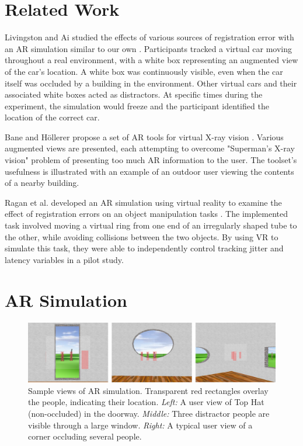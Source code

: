 \documentclass{acmsiggraph}                     %
\begin{document}
\section{Related Work}

Livingston and Ai studied the effects of various sources of registration error with an AR simulation similar to our own \cite{4637329}.  Participants tracked a virtual car moving throughout a real environment, with a white box representing an augmented view of the car's location.  A white box was continuously visible, even when the car itself was occluded by a building in the environment.  Other virtual cars and their associated white boxes acted as distractors.  At specific times during the experiment, the simulation would freeze and the participant identified the location of the correct car.

Bane and H\"{o}llerer propose a set of AR tools for virtual X-ray vision \cite{1383060}.  Various augmented views are presented, each attempting to overcome "Superman's X-ray vision" problem of presenting too much AR information to the user.  The toolset's usefulness is illustrated with an example of an outdoor user viewing the contents of a nearby building.

Ragan et al. developed an AR simulation using virtual reality to examine the effect of registration errors on an object manipulation tasks \cite{4811058}.  The implemented task involved moving a virtual ring from one end of an irregularly shaped tube to the other, while avoiding collisions between the two objects.  By using VR to simulate this task, they were able to independently control tracking jitter and latency variables in a pilot study.



\section{AR Simulation}

\begin{figure}[ht!]
	\centering
	\includegraphics[width=5in]{figures/triple_view.png}
	\caption{Sample views of AR simulation.  Transparent red rectangles overlay the people, indicating their location.  \emph{Left:} A user view of Top Hat (non-occluded) in the doorway.   \emph{Middle:} Three distractor people are visible through a large window.  \emph{Right:} A typical user view of a corner occluding several people.}
\end{figure}
\end{document}
